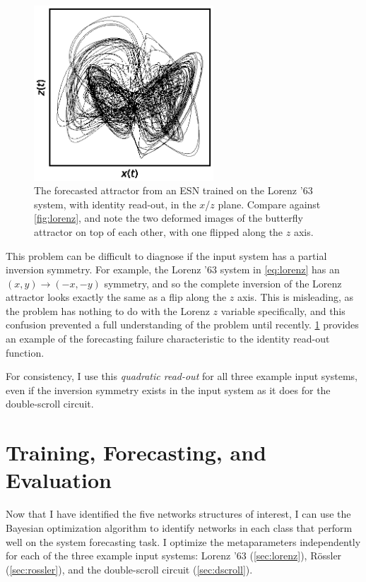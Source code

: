 \begin{figure}
  \includegraphics[width=0.6\textwidth]{figures/lorenz-symmetry}
  \caption{The forecasted attractor from an ESN trained on the Lorenz
    '63 system, with identity read-out, in the $x$/$z$ plane. Compare
    against \cref{fig:lorenz}, and note the two deformed images of the
    butterfly attractor on top of each other, with one flipped along
    the $z$ axis.}
  \label{fig:lorenz-symmetry}
\end{figure}

This problem can be difficult to diagnose if the input system has a
partial inversion symmetry. For example, the Lorenz '63 system in
\cref{eq:lorenz} has an $(x, y) \rightarrow (-x, -y)$ symmetry, and so the
complete inversion of the Lorenz attractor looks exactly the same as a
flip along the $z$ axis. This is misleading, as the problem has
nothing to do with the Lorenz $z$ variable specifically, and this
confusion prevented a full understanding of the problem until
recently.\cite{herteux2020} \cref{fig:lorenz-symmetry} provides an
example of the forecasting failure characteristic to the identity
read-out function.

For consistency, I use this \emph{quadratic read-out} for all three
example input systems, even if the inversion symmetry exists in the
input system as it does for the double-scroll circuit.

\section{Training, Forecasting, and Evaluation}

Now that I have identified the five networks structures of interest, I
can use the Bayesian optimization algorithm to identify networks in
each class that perform well on the system forecasting task. I
optimize the metaparameters independently for each of the three
example input systems: Lorenz '63 (\cref{sec:lorenz}), R{\"{o}}ssler
(\cref{sec:rossler}), and the double-scroll circuit
(\cref{sec:dscroll}).

